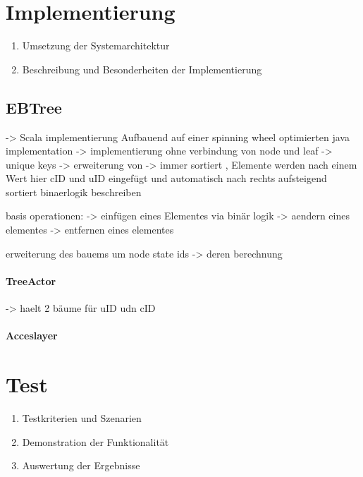 \documentclass[a4paper,11pt,oneside,%
headsepline,												%
footsepline,												%
bibtotocnumbered									%
]{scrreprt}
\begin{document}
\chapter{Implementierung}
		\begin{enumerate}[1.]
			\item Umsetzung der Systemarchitektur
			\item Beschreibung und Besonderheiten der Implementierung
		\end{enumerate}

\section{EBTree} %
-> Scala implementierung Aufbauend auf einer spinning wheel optimierten java implementation
-> implementierung ohne verbindung von node und leaf
-> unique keys
-> erweiterung von
-> immer sortiert , Elemente werden nach einem Wert hier cID und uID eingefügt und automatisch nach rechts aufsteigend sortiert
binaerlogik beschreiben

basis operationen:
-> einfügen eines Elementes via binär logik
-> aendern eines elementes 
-> entfernen eines elementes

erweiterung des bauems um node state ids
-> deren berechnung

\subsubsection{TreeActor}
-> haelt 2 bäume für uID udn cID

\subsubsection{Acceslayer}
\chapter{Test}
		\begin{enumerate}[1.]
			\item Testkriterien und Szenarien
			\item Demonstration der Funktionalität
			\item Auswertung der Ergebnisse
		\end{enumerate}
\end{document}

